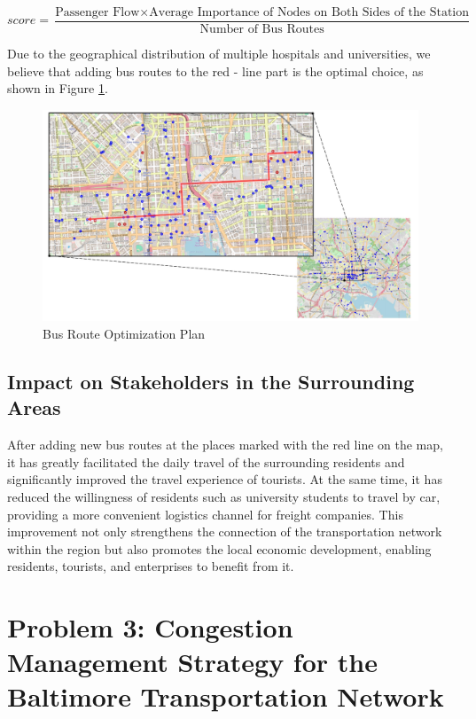 \documentclass{mcmthesis}
\begin{document}
\begin{equation}
score=\dfrac{\text{Passenger Flow}\times \text{Average Importance of Nodes on Both Sides of the Station}}{\text{Number of Bus Routes}}
\end{equation}

Due to the geographical distribution of multiple hospitals and universities, we believe that adding bus routes to the red - line part is the optimal choice, as shown in Figure \ref{fig:busroute}.

\begin{figure}[H]
  \centering
  \includegraphics[width=\textwidth]{figures/busroute.pdf}
  \caption{Bus Route Optimization Plan}
  \label{fig:busroute}
\end{figure}

\subsection{Impact on Stakeholders in the Surrounding Areas}

After adding new bus routes at the places marked with the red line on the map, it has greatly facilitated the daily travel of the surrounding residents and significantly improved the travel experience of tourists. At the same time, it has reduced the willingness of residents such as university students to travel by car, providing a more convenient logistics channel for freight companies. This improvement not only strengthens the connection of the transportation network within the region but also promotes the local economic development, enabling residents, tourists, and enterprises to benefit from it.

\section{Problem 3: Congestion Management Strategy for the Baltimore Transportation Network}
\end{document}
